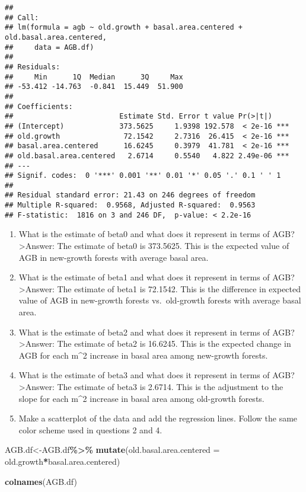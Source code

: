 \documentclass[
]{article}
\newenvironment{Shaded}{\begin{snugshade}}{\end{snugshade}}
\newcommand{\AttributeTok}[1]{\textcolor[rgb]{0.13,0.29,0.53}{#1}}
\newcommand{\FunctionTok}[1]{\textcolor[rgb]{0.13,0.29,0.53}{\textbf{#1}}}
\newcommand{\NormalTok}[1]{#1}
\newcommand{\OtherTok}[1]{\textcolor[rgb]{0.56,0.35,0.01}{#1}}
\newcommand{\SpecialCharTok}[1]{\textcolor[rgb]{0.81,0.36,0.00}{\textbf{#1}}}
\begin{document}
\begin{verbatim}
## 
## Call:
## lm(formula = agb ~ old.growth + basal.area.centered + old.basal.area.centered, 
##     data = AGB.df)
## 
## Residuals:
##     Min      1Q  Median      3Q     Max 
## -53.412 -14.763  -0.841  15.449  51.900 
## 
## Coefficients:
##                         Estimate Std. Error t value Pr(>|t|)    
## (Intercept)             373.5625     1.9398 192.578  < 2e-16 ***
## old.growth               72.1542     2.7316  26.415  < 2e-16 ***
## basal.area.centered      16.6245     0.3979  41.781  < 2e-16 ***
## old.basal.area.centered   2.6714     0.5540   4.822 2.49e-06 ***
## ---
## Signif. codes:  0 '***' 0.001 '**' 0.01 '*' 0.05 '.' 0.1 ' ' 1
## 
## Residual standard error: 21.43 on 246 degrees of freedom
## Multiple R-squared:  0.9568, Adjusted R-squared:  0.9563 
## F-statistic:  1816 on 3 and 246 DF,  p-value: < 2.2e-16
\end{verbatim}

\begin{enumerate}
\def\labelenumi{\alph{enumi}.}
\item
  What is the estimate of beta0 and what does it represent in terms of
  AGB? \textgreater Answer: The estimate of beta0 is 373.5625. This is
  the expected value of AGB in new-growth forests with average basal
  area.
\item
  What is the estimate of beta1 and what does it represent in terms of
  AGB? \textgreater Answer: The estimate of beta1 is 72.1542. This is
  the difference in expected value of AGB in new-growth forests
  vs.~old-growth forests with average basal area.
\item
  What is the estimate of beta2 and what does it represent in terms of
  AGB? \textgreater Answer: The estimate of beta2 is 16.6245. This is
  the expected change in AGB for each m\^{}2 increase in basal area
  among new-growth forests.
\item
  What is the estimate of beta3 and what does it represent in terms of
  AGB? \textgreater Answer: The estimate of beta3 is 2.6714. This is the
  adjustment to the slope for each m\^{}2 increase in basal area among
  old-growth forests.
\item
  Make a scatterplot of the data and add the regression lines. Follow
  the same color scheme used in questions 2 and 4.
\end{enumerate}

\begin{Shaded}
\begin{Highlighting}[]
\NormalTok{AGB.df}\OtherTok{\textless{}{-}}\NormalTok{AGB.df}\SpecialCharTok{\%\textgreater{}\%}
  \FunctionTok{mutate}\NormalTok{(}\AttributeTok{old.basal.area.centered =}\NormalTok{ old.growth}\SpecialCharTok{*}\NormalTok{basal.area.centered)}

\FunctionTok{colnames}\NormalTok{(AGB.df)}
\end{Highlighting}
\end{Shaded}
\end{document}
